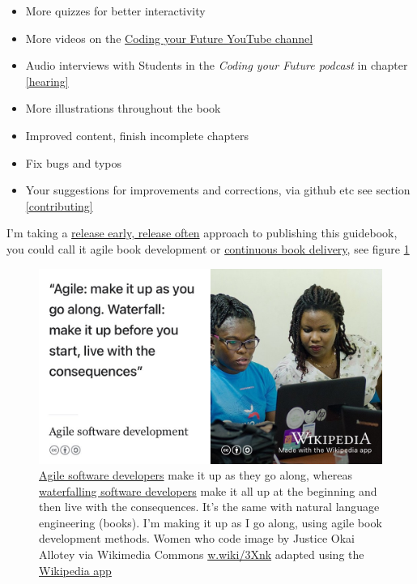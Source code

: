 \documentclass[
]{book}
\providecommand{\tightlist}{%
  \setlength{\itemsep}{0pt}\setlength{\parskip}{0pt}}
\begin{document}
\begin{itemize}
\tightlist
\item
  More quizzes for better interactivity
\item
  More videos on the \href{https://www.youtube.com/channel/UCLBv_u8JmyUPqmRALIjVnLg}{Coding your Future YouTube channel}
\item
  Audio interviews with Students in the \emph{Coding your Future podcast} in chapter \ref{hearing}
\item
  More illustrations throughout the book
\item
  Improved content, finish incomplete chapters
\item
  Fix bugs and typos
\item
  Your suggestions for improvements and corrections, via github etc see section \ref{contributing}
\end{itemize}

I'm taking a \href{https://en.wikipedia.org/wiki/Release_early,_release_often}{release early, release often} \citep{Raymond1999} approach to publishing this guidebook, you could call it agile book development or \href{https://en.wikipedia.org/wiki/Continuous_delivery}{continuous book delivery}, see figure \ref{fig:agile-vs-waterfall-fig} \citep{realagile}

\begin{figure}

{\centering \includegraphics[width=1\linewidth]{images/agile-vs-waterfall} 

}

\caption{\href{https://en.wikipedia.org/wiki/Agile_software_development}{Agile software developers} make it up as they go along, whereas \href{https://en.wikipedia.org/wiki/Waterfall_model}{waterfalling software developers} make it all up at the beginning and then live with the consequences. It's the same with natural language engineering (books). I'm making it up as I go along, using agile book development methods. Women who code image by Justice Okai Allotey via Wikimedia Commons \href{https://w.wiki/3Xnk}{w.wiki/3Xnk} adapted using the \href{https://apps.apple.com/us/app/wikipedia/id324715238}{Wikipedia app}}\label{fig:agile-vs-waterfall-fig}
\end{figure}
\end{document}
